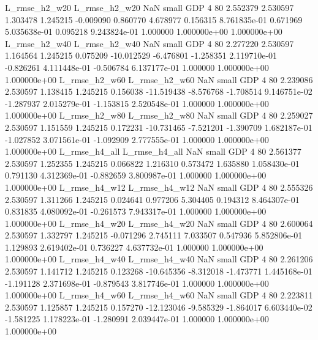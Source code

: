  L_rmse_h2_w20  L_rmse_h2_w20                   NaN      small      GDP                 4 80 2.552379       2.530597 1.303478       1.245215   -0.009090      0.860770      4.678977     0.156315   8.761835e-01  0.671969 5.035638e-01     0.095218   9.243824e-01            1.000000    1.000000e+00        1.000000e+00
 L_rmse_h2_w40  L_rmse_h2_w40                   NaN      small      GDP                 4 80 2.277220       2.530597 1.164564       1.245215    0.075209    -10.012529     -6.476801    -1.258351   2.119710e-01 -0.826261 4.111448e-01    -0.506784   6.137177e-01            1.000000    1.000000e+00        1.000000e+00
 L_rmse_h2_w60  L_rmse_h2_w60                   NaN      small      GDP                 4 80 2.239086       2.530597 1.138415       1.245215    0.156038    -11.519438     -8.576768    -1.708514   9.146751e-02 -1.287937 2.015279e-01    -1.153815   2.520548e-01            1.000000    1.000000e+00        1.000000e+00
 L_rmse_h2_w80  L_rmse_h2_w80                   NaN      small      GDP                 4 80 2.259027       2.530597 1.151559       1.245215    0.172231    -10.731465     -7.521201    -1.390709   1.682187e-01 -1.027852 3.071561e-01    -1.092909   2.777555e-01            1.000000    1.000000e+00        1.000000e+00
 L_rmse_h4_all  L_rmse_h4_all                   NaN      small      GDP                 4 80 2.561377       2.530597 1.252355       1.245215    0.066822      1.216310      0.573472     1.635880   1.058430e-01  0.791130 4.312369e-01    -0.882659   3.800987e-01            1.000000    1.000000e+00        1.000000e+00
 L_rmse_h4_w12  L_rmse_h4_w12                   NaN      small      GDP                 4 80 2.555326       2.530597 1.311266       1.245215    0.024641      0.977206      5.304405     0.194312   8.464307e-01  0.831835 4.080092e-01    -0.261573   7.943317e-01            1.000000    1.000000e+00        1.000000e+00
 L_rmse_h4_w20  L_rmse_h4_w20                   NaN      small      GDP                 4 80 2.600064       2.530597 1.332797       1.245215   -0.071296      2.745111      7.033507     0.547936   5.852806e-01  1.129893 2.619402e-01     0.736227   4.637732e-01            1.000000    1.000000e+00        1.000000e+00
 L_rmse_h4_w40  L_rmse_h4_w40                   NaN      small      GDP                 4 80 2.261206       2.530597 1.141712       1.245215    0.123268    -10.645356     -8.312018    -1.473771   1.445168e-01 -1.191128 2.371698e-01    -0.879543   3.817746e-01            1.000000    1.000000e+00        1.000000e+00
 L_rmse_h4_w60  L_rmse_h4_w60                   NaN      small      GDP                 4 80 2.223811       2.530597 1.125857       1.245215    0.157270    -12.123046     -9.585329    -1.864017   6.603440e-02 -1.581225 1.178223e-01    -1.280991   2.039447e-01            1.000000    1.000000e+00        1.000000e+00
